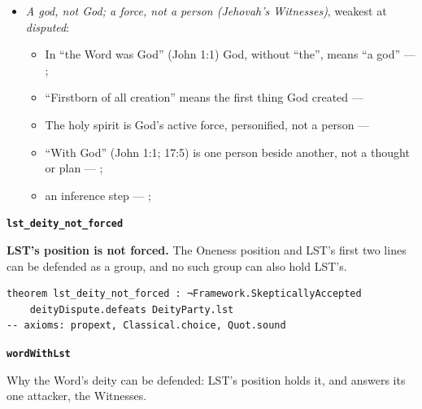 \documentclass[11pt,paper=\testimonypaper,DIV=13,parskip=false]{scrartcl}
\begin{document}
\begin{itemize}
\begin{itemize}
\end{itemize}
\item \emph{A god, not God; a force, not a person (Jehovah’s Witnesses)}, weakest at \emph{disputed}:
\begin{itemize}
\item In “the Word was God” (John 1:1) God, without “the”, means “a god” --- \cite[27]{watchtower-should-you-believe-trinity-1989}; \cite{new-world-translation-2013}
\item “Firstborn of all creation” means the first thing God created --- \cite[14]{watchtower-should-you-believe-trinity-1989}
\item The holy spirit is God’s active force, personified, not a person --- \cite[20--23]{watchtower-should-you-believe-trinity-1989}
\item “With God” (John 1:1; 17:5) is one person beside another, not a thought or plan --- \cite[3, The Triune God]{kibbey-living-systematic-theology-2026}; \cite[27]{watchtower-should-you-believe-trinity-1989}
\item an inference step --- \cite[23]{watchtower-should-you-believe-trinity-1989}; \cite[122--123]{roberts-christendom-astray}
\end{itemize}
\end{itemize}
\par\medskip\noindent\textbf{\texttt{lst\_\allowbreak{}deity\_\allowbreak{}not\_\allowbreak{}forced}}\par\nobreak\noindent
\textbf{LST’s position is not forced.} The Oneness position and LST’s first two lines can be defended as a group, and no such group can also hold LST’s.

{\small\begin{verbatim}
theorem lst_deity_not_forced : ¬Framework.SkepticallyAccepted
    deityDispute.defeats DeityParty.lst
-- axioms: propext, Classical.choice, Quot.sound
\end{verbatim}}
\par\medskip\noindent\textbf{\texttt{word\allowbreak{}With\allowbreak{}Lst}}\par\nobreak\noindent
Why the Word’s deity can be defended: LST’s position holds it, and answers its one attacker, the Witnesses.
\end{document}
